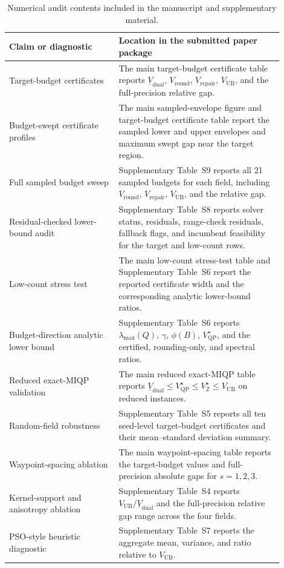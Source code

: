 \begin{table}[h]
\centering
\caption{Numerical audit contents included in the manuscript and supplementary material.}
\label{tab:audit-si}
\begin{tabular}{p{0.36\linewidth}p{0.54\linewidth}}
\toprule
Claim or diagnostic & Location in the submitted paper package \\
\midrule
Target-budget certificates & The main target-budget certificate table reports
$\underline V_{\mathrm{dual}}$, $V_{\mathrm{round}}$, $V_{\mathrm{repair}}$,
$V_{\mathrm{UB}}$, and the full-precision relative gap. \\
Budget-swept certificate profiles & The main sampled-envelope figure and
target-budget certificate table report the
sampled lower and upper envelopes and maximum swept gap near the target region. \\
Full sampled budget sweep & Supplementary Table~S9 reports all 21 sampled
budgets for each field, including $V_{\mathrm{round}}$, $V_{\mathrm{repair}}$,
$V_{\mathrm{UB}}$, and the relative gap. \\
Residual-checked lower-bound audit & Supplementary Table~S8 reports solver
status, residuals, range-check residuals, fallback flags, and incumbent
feasibility for the target and low-count rows. \\
Low-count stress test & The main low-count stress-test table and Supplementary
Table~S6 report the
reported certificate width and the corresponding analytic lower-bound ratios. \\
Budget-direction analytic lower bound & Supplementary Table~S6 reports
$\lambda_{\max}(Q)$, $\gamma$, $\phi(B)$, $V_{\mathrm{QP}}^\star$, and the
certified, rounding-only, and spectral ratios. \\
Reduced exact-MIQP validation & The main reduced exact-MIQP table reports
$\underline V_{\mathrm{dual}}\le V_{\mathrm{QP}}^\star\le V_{\mathbb Z}^\star
\le V_{\mathrm{UB}}$ on reduced instances. \\
Random-field robustness & Supplementary Table~S5 reports all ten seed-level
target-budget certificates and their mean--standard deviation summary. \\
Waypoint-spacing ablation & The main waypoint-spacing table reports the target-budget values and
full-precision absolute gaps for $s=1,2,3$. \\
Kernel-support and anisotropy ablation & Supplementary Table~S4 reports
$V_{\mathrm{UB}}/\underline V_{\mathrm{dual}}$ and the full-precision relative
gap range across the four fields. \\
PSO-style heuristic diagnostic & Supplementary Table~S7 reports the aggregate
mean, variance, and ratio relative to $V_{\mathrm{UB}}$. \\
\bottomrule
\end{tabular}
\end{table}

